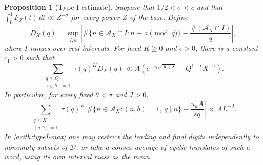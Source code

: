 \documentclass[11pt,a4paper]{article}
\theoremstyle{paperplain}
\newtheorem{proposition}[theorem]{Proposition}
\numberwithin{equation}{section}
\begin{document}
\begin{proposition}[Type I estimate]\label{arith:typeI}
Suppose that $1/2<\sigma<c$ and that
$\int_0^1F_Z(t)\,dt\ll Z^{-\sigma}$ for every power $Z$ of the base.
Define
\[
 D_X(q)=\sup_{I,a}\left|
 \#\{n\in\mathcal A_X\cap I:n\equiv a\pmod q\}
 -\frac{\#(\mathcal A_X\cap I)}q\right|,
\]
where $I$ ranges over real intervals. For fixed $K\ge0$ and
$\epsilon>0$, there is a constant $c_1>0$ such that
\begin{equation}\label{arith:typeI-max}
 \sum_{\substack{q\le Q\\(q,b)=1}}\tau(q)^K D_X(q)
 \ll A\left(e^{-c_1\sqrt{\log X}}+
                      Q^{1+\epsilon}X^{-\sigma}\right).
\end{equation}
In particular, for every fixed $\theta<\sigma$ and $J>0$,
\begin{equation}\label{arith:typeI-unit}
 \sum_{\substack{q\le X^\theta\\(q,b)=1}}\tau(q)^K
 \left|\#\{n\in\mathcal A_X:(n,b)=1,\ q\mid n\}
                -\frac{u_d A}{sq}\right|
 \ll A L^{-J}.
\end{equation}
In \eqref{arith:typeI-max} one may restrict the leading and final
digits independently to nonempty subsets of $\mathcal D$, or take
a convex average of cyclic translates of such a word, using its
own interval mass as the mean.
\end{proposition}
\end{document}
